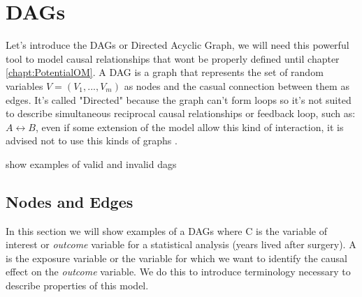 \chapter{DAGs}
\label{chapt:DAGs}
Let's introduce the DAGs or Directed Acyclic Graph, we will need this powerful tool to model causal relationships that wont be properly defined until chapter \ref{chapt:PotentialOM}.
A DAG is a graph that represents the set of random variables $ V = (V_1,..., V_m)$ as nodes and the casual connection between them as edges. It's called "Directed" because the graph can't form loops so it's not suited to describe simultaneous reciprocal causal relationships or feedback loop, such as: $A \leftrightarrow B $, even if some extension of the model allow this kind of interaction, it is advised not to use this kinds of graphs \citep{cunningham2021causal}.

show examples of valid and invalid dags



%
%    		
%
%
%



\section{Nodes and Edges}
In this section we will show examples of a DAGs where C is the variable of interest or \textit{outcome} variable for a statistical analysis (years lived after surgery). A is the exposure variable or the variable for which we want to identify the causal effect on the \textit{outcome} variable. We do this to introduce terminology necessary to describe properties of this model.
